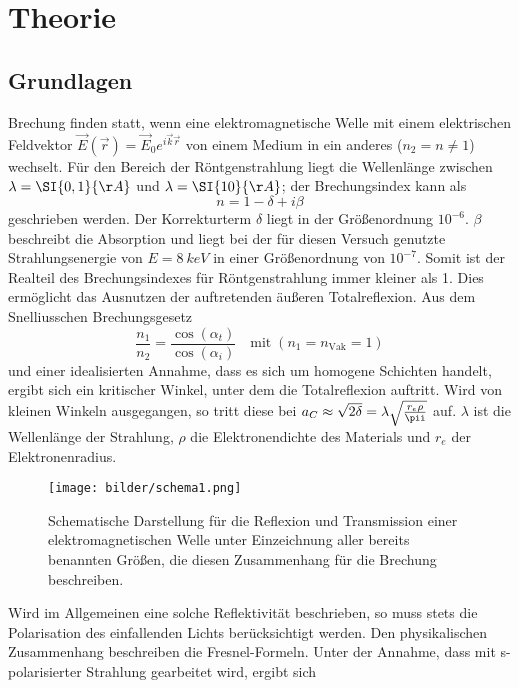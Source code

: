 \section{Theorie}
\subsection{Grundlagen}
Brechung finden statt, wenn eine elektromagnetische Welle mit einem elektrischen Feldvektor $\vec{E}(\vec{r})=\vec{E}_0e^{i\vec{k}\vec{r}}$ von einem Medium in ein anderes ($n_2=n\neq1$) wechselt. Für den Bereich der Röntgenstrahlung liegt die Wellenlänge zwischen $\lambda=\SI{0,1}{\AA}$ und $\lambda=\SI{10}{\AA}$; der Brechungsindex kann als
\begin{equation*}
  n=1-\delta+i\beta
  \label{eq:brechungsindex}
\end{equation*}
geschrieben werden. Der Korrekturterm $\delta$ liegt in der Größenordnung $10^{-6}$. $\beta$ beschreibt die Absorption und liegt bei der für diesen Versuch genutzte Strahlungsenergie von $E=\SI{8}{keV}$ in einer Größenordnung von $10^{-7}$. Somit ist der Realteil des Brechungsindexes für Röntgenstrahlung immer kleiner als 1. Dies ermöglicht das Ausnutzen der auftretenden äußeren Totalreflexion. Aus dem Snelliusschen Brechungsgesetz
\begin{equation*}
\frac{n_1}{n_2}=\frac{\cos(\alpha_t)}{\cos(\alpha_i)}\quad\text{mit}\; (n_1=n_\text{Vak}=1)
\label{eq:snellius}
\end{equation*}
 und einer idealisierten Annahme, dass es sich um homogene Schichten handelt, ergibt sich ein kritischer Winkel, unter dem die Totalreflexion auftritt. Wird von kleinen Winkeln ausgegangen, so tritt diese bei $a_C\approx\sqrt{2\delta}=\lambda\sqrt{\frac{r_e\rho}{\pii}}$
 auf. $\lambda$ ist die Wellenlänge der Strahlung, $\rho$ die Elektronendichte des Materials und $r_e$ der Elektronenradius.
 \begin{figure}[H]
   \centering
   \texttt{[image: bilder/schema1.png]}
   \caption{Schematische Darstellung für die Reflexion und Transmission einer elektromagnetischen Welle unter Einzeichnung aller bereits benannten Größen, die diesen Zusammenhang für die Brechung beschreiben\cite{anleitung}.}
   \label{schema1}
 \end{figure}
Wird im Allgemeinen eine solche Reflektivität beschrieben, so muss stets die Polarisation des einfallenden Lichts berücksichtigt werden. Den physikalischen Zusammenhang beschreiben die Fresnel-Formeln. Unter der Annahme, dass mit s-polarisierter Strahlung gearbeitet wird, ergibt sich
